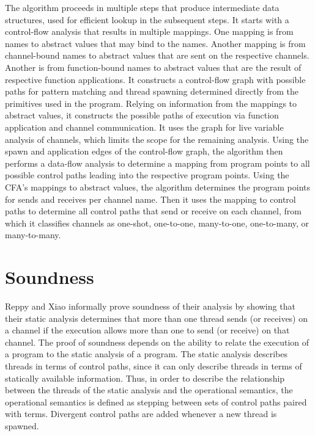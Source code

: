 \documentclass[10pt]{article}
\begin{document}
The algorithm proceeds in multiple steps that produce intermediate data structures, used for
efficient lookup in the subsequent steps.  It starts with a control-flow analysis \cite{} that
results in multiple mappings. One mapping is from names to abstract values that may bind to
the names. Another mapping is from channel-bound names to abstract values that are
sent on the respective channels. Another is from function-bound names to abstract values
that are the result of respective function applications.  It constructs a control-flow graph 
with possible paths for pattern matching and thread spawning determined directly from the
primitives used in the program.  Relying on information from the mappings to abstract values,
it constructs the possible paths of execution via function application and channel
communication.  It uses the graph for live variable analysis of channels, which limits the
scope for the remaining analysis.  Using the spawn and application edges of the control-flow
graph, the algorithm then performs a data-flow analysis to determine a mapping from program
points to all possible control paths leading into the respective program points.  Using the
CFA's mappings to abstract values, the algorithm determines the program points for sends and
receives per channel name.  Then it uses the mapping to control paths to determine all
control paths that send or receive on each channel, from which it classifies channels as
one-shot, one-to-one, many-to-one, one-to-many, or many-to-many.

\section{Soundness}
Reppy and Xiao informally prove soundness of their analysis by showing that their static analysis
determines that more than one thread sends (or receives) on a channel if the execution allows more
than one to send (or receive) on that channel. The proof of soundness depends on the
ability to relate the execution of a program to the static analysis of a program. The static
analysis describes threads in terms of control paths, since it can only describe threads in
terms of statically available information. Thus, in order to describe the relationship between
the threads of the static analysis and the operational semantics, the operational semantics is
defined as stepping between sets of control paths paired with terms. Divergent control paths
are added whenever a new thread is spawned.
\end{document}
